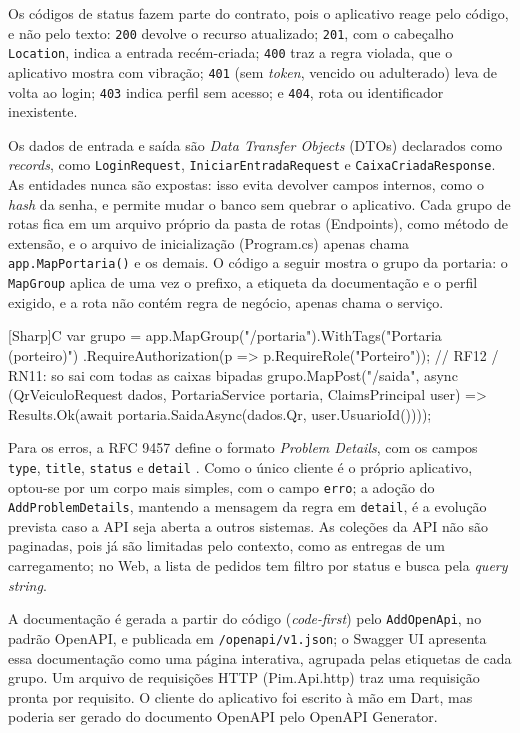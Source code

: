 Os códigos de status fazem parte do contrato, pois o aplicativo reage pelo código, e não pelo texto: \texttt{200} devolve o recurso atualizado; \texttt{201}, com o cabeçalho \texttt{Location}, indica a entrada recém-criada; \texttt{400} traz a regra violada, que o aplicativo mostra com vibração; \texttt{401} (sem \textit{token}, vencido ou adulterado) leva de volta ao login; \texttt{403} indica perfil sem acesso; e \texttt{404}, rota ou identificador inexistente.

Os dados de entrada e saída são \textit{Data Transfer Objects} (DTOs) declarados como \textit{records}, como \texttt{LoginRequest}, \texttt{IniciarEntradaRequest} e \texttt{CaixaCriadaResponse}. As entidades nunca são expostas: isso evita devolver campos internos, como o \textit{hash} da senha, e permite mudar o banco sem quebrar o aplicativo. Cada grupo de rotas fica em um arquivo próprio da pasta de rotas (Endpoints), como método de extensão, e o arquivo de inicialização (Program.cs) apenas chama \texttt{app.MapPortaria()} e os demais. O código a seguir mostra o grupo da portaria: o \texttt{MapGroup} aplica de uma vez o prefixo, a etiqueta da documentação e o perfil exigido, e a rota não contém regra de negócio, apenas chama o serviço.

\begin{codeblock}{[Sharp]C}
var grupo = app.MapGroup("/portaria").WithTags("Portaria (porteiro)")
    .RequireAuthorization(p => p.RequireRole("Porteiro"));
// RF12 / RN11: so sai com todas as caixas bipadas
grupo.MapPost("/saida", async (QrVeiculoRequest dados,
        PortariaService portaria, ClaimsPrincipal user) =>
    Results.Ok(await portaria.SaidaAsync(dados.Qr, user.UsuarioId())));
\end{codeblock}

Para os erros, a RFC 9457 define o formato \textit{Problem Details}, com os campos \texttt{type}, \texttt{title}, \texttt{status} e \texttt{detail} \cite{ietf2023problem}. Como o único cliente é o próprio aplicativo, optou-se por um corpo mais simples, com o campo \texttt{erro}; a adoção do \texttt{AddProblemDetails}, mantendo a mensagem da regra em \texttt{detail}, é a evolução prevista caso a API seja aberta a outros sistemas. As coleções da API não são paginadas, pois já são limitadas pelo contexto, como as entregas de um carregamento; no Web, a lista de pedidos tem filtro por status e busca pela \textit{query string}.

A documentação é gerada a partir do código (\textit{code-first}) pelo \texttt{AddOpenApi}, no padrão OpenAPI, e publicada em \texttt{/openapi/v1.json}; o Swagger UI apresenta essa documentação como uma página interativa, agrupada pelas etiquetas de cada grupo. Um arquivo de requisições HTTP (Pim.Api.http) traz uma requisição pronta por requisito. O cliente do aplicativo foi escrito à mão em Dart, mas poderia ser gerado do documento OpenAPI pelo OpenAPI Generator.

